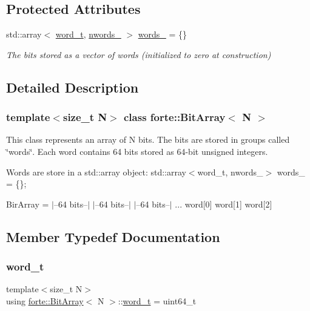 \subsection*{Protected Attributes}
\begin{DoxyCompactItemize}
\item 
std\+::array$<$ \mbox{\hyperlink{classforte_1_1_bit_array_a7f3b4ebbbe4bc80ce60cc6614cb565da}{word\+\_\+t}}, \mbox{\hyperlink{classforte_1_1_bit_array_aeaa8016f00f9ffc5822081f7e45656e8}{nwords\+\_\+}} $>$ \mbox{\hyperlink{classforte_1_1_bit_array_a3c8589dce264f70e98857d6e9eed1245}{words\+\_\+}} = \{\}
\begin{DoxyCompactList}\small\item\em The bits stored as a vector of words (initialized to zero at construction) \end{DoxyCompactList}\end{DoxyCompactItemize}


\subsection{Detailed Description}
\subsubsection*{template$<$size\+\_\+t N$>$\newline
class forte\+::\+Bit\+Array$<$ N $>$}

This class represents an array of N bits. The bits are stored in groups called \char`\"{}words\char`\"{}. Each word contains 64 bits stored as 64-\/bit unsigned integers. 

Words are store in a std\+::array object\+: std\+::array$<$word\+\_\+t, nwords\+\_\+$>$ words\+\_\+ = \{\};

Bir\+Array = $\vert$--64 bits--$\vert$ $\vert$--64 bits--$\vert$ $\vert$--64 bits--$\vert$ ... word\mbox{[}0\mbox{]} word\mbox{[}1\mbox{]} word\mbox{[}2\mbox{]} 

\subsection{Member Typedef Documentation}
\mbox{\label{classforte_1_1_bit_array_a7f3b4ebbbe4bc80ce60cc6614cb565da}} 
\subsubsection{\texorpdfstring{word\+\_\+t}{word\_t}}
{\footnotesize\ttfamily template$<$size\+\_\+t N$>$ \\
using \mbox{\hyperlink{classforte_1_1_bit_array}{forte\+::\+Bit\+Array}}$<$ N $>$\+::\mbox{\hyperlink{classforte_1_1_bit_array_a7f3b4ebbbe4bc80ce60cc6614cb565da}{word\+\_\+t}} =  uint64\+\_\+t}



